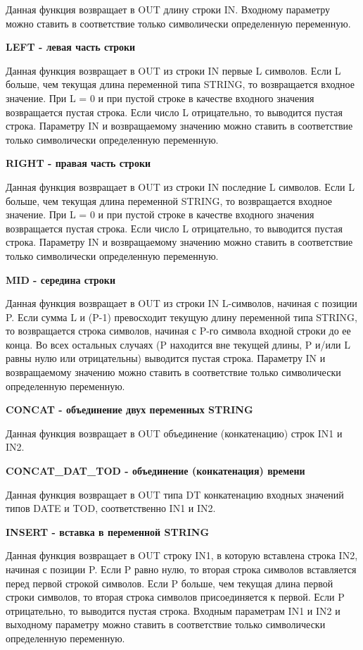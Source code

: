 \documentclass[letterpaper,10pt,russian]{sphinxmanual}
\begin{document}
Данная функция возвращает в OUT длину строки IN. Входному параметру
можно ставить в соответствие только символически определенную
переменную.

\textbf{LEFT - левая часть строки}

Данная функция возвращает в OUT из строки IN первые L символов. Если L
больше, чем текущая длина переменной типа STRING, то возвращается
входное значение. При L = 0 и при пустой строке в качестве входного
значения возвращается пустая строка. Если число L отрицательно, то
выводится пустая строка. Параметру IN и возвращаемому значению можно
ставить в соответствие только символически определенную переменную.

\textbf{RIGHT - правая часть строки}

Данная функция возвращает в OUT из строки IN последние L символов. Если
L больше, чем текущая длина переменной STRING, то возвращается входное
значение. При L = 0 и при пустой строке в качестве входного значения
возвращается пустая строка. Если число L отрицательно, то выводится
пустая строка. Параметру IN и возвращаемому значению можно ставить в
соответствие только символически определенную переменную.

\textbf{MID - середина строки}

Данная функция возвращает в OUT из строки IN L-символов, начиная с
позиции P. Если сумма L и (P-1) превосходит текущую длину переменной
типа STRING, то возвращается строка символов, начиная с P-го символа
входной строки до ее конца. Во всех остальных случаях (P находится вне
текущей длины, P и/или L равны нулю или отрицательны) выводится пустая
строка. Параметру IN и возвращаемому значению можно ставить в
соответствие только символически определенную переменную.

\textbf{CONCAT - объединение двух переменных STRING}

Данная функция возвращает в OUT объединение (конкатенацию) строк IN1 и
IN2.

\textbf{CONCAT\_DAT\_TOD - объединение (конкатенация) времени}

Данная функция возвращает в OUT типа DT конкатенацию входных значений
типов DATE и TOD, соответственно IN1 и IN2.

\textbf{INSERT - вставка в переменной STRING}

Данная функция возвращает в OUT строку IN1, в которую вставлена строка
IN2, начиная с позиции P. Если P равно нулю, то вторая строка символов
вставляется перед первой строкой символов. Если P больше, чем текущая
длина первой строки символов, то вторая строка символов присоединяется к
первой. Если P отрицательно, то выводится пустая строка. Входным
параметрам IN1 и IN2 и выходному параметру можно ставить в соответствие
только символически определенную переменную.
\end{document}
